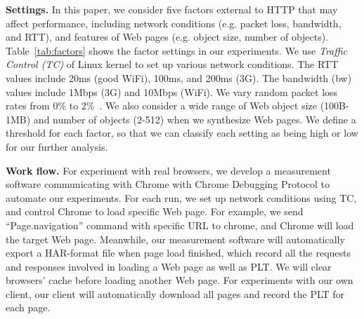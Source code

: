 \textbf{Settings.} In this paper, we consider five factors external to HTTP that may affect performance, including network conditions (e.g. packet loss, bandwidth, and RTT), and features of Web pages (e.g. object size, number of objects). Table~\ref{tab:factors} shows the factor settings in our experiments. We use \textit{Traffic Control (TC)} of Linux kernel to set up various network conditions. The RTT values include 20ms (good WiFi), 100ms, and 200ms (3G). The bandwidth (bw) values include 1Mbps (3G) and 10Mbps (WiFi). We vary random packet loss rates from 0\% to 2\%~\cite{Dukkipati:SIGCOMM11}. We also consider a wide range of Web object size (100B-1MB) and number of objects (2-512) when we synthesize Web pages. We define a threshold for each factor, so that we can classify each setting as being high or low for our further analysis.

\textbf{Work flow.} For experiment with real browsers, we develop a measurement software communicating with Chrome with Chrome Debugging Protocol to automate our experiments. For each run, we set up network conditions using TC, and control Chrome to load specific Web page. For example, we send ``Page.navigation'' command with specific URL to chrome, and Chrome will load the target Web page. Meanwhile, our measurement software will automatically export a HAR-format file when page load finished, which record all the requests and responses involved in loading a Web page as well as PLT. We will clear browsers' cache before loading another Web page. For experiments with our own client, our client will automatically download all pages and record the PLT for each page.
